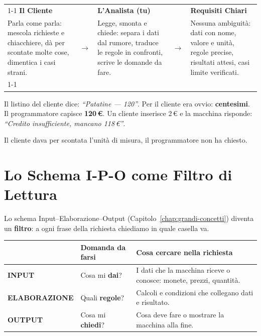\begin{center}
\renewcommand{\arraystretch}{1.5}
\begin{tabular}{|p{4cm}|c|p{4cm}|c|p{4cm}|}
\cline{1-1}\cline{3-3}\cline{5-5}
\cellcolor{PiazzaPrimary!10}\textbf{Il Cliente} & & \cellcolor{BoxBlue!10}\textbf{L'Analista (tu)} & & \cellcolor{BoxGreen!10}\textbf{Requisiti Chiari} \\
\small Parla come parla: mescola richieste e chiacchiere, dà per scontate molte cose, dimentica i casi strani.
 & \multicolumn{1}{c}{$\longrightarrow$} &
\small Legge, smonta e chiede: separa i dati dal rumore, traduce le regole in confronti, scrive le domande da fare.
 & \multicolumn{1}{c}{$\longrightarrow$} &
\small Nessuna ambiguità: dati con nome, valore e unità, regole precise, risultati attesi, casi limite verificati. \\
\cline{1-1}\cline{3-3}\cline{5-5}
\end{tabular}
\end{center}

\begin{attenzione}
Il listino del cliente dice: \emph{``Patatine --- 120''}. Per il cliente era ovvio: \textbf{centesimi}.\\
Il programmatore capisce \textbf{120\,\euro}. Un cliente inserisce 2\,\euro{} e la macchina risponde: \emph{``Credito insufficiente, mancano 118\,\euro''}.

\smallskip
Il cliente dava per scontata l'unità di misura, il programmatore non ha chiesto.
\end{attenzione}

\section{Lo Schema I-P-O come Filtro di Lettura}

Lo schema Input--Elaborazione--Output (Capitolo~\ref{chap:grandi-concetti}) diventa un \textbf{filtro}: a ogni frase della richiesta chiediamo in quale casella va.

\begin{center}
\renewcommand{\arraystretch}{1.45}
\begin{tabular}{|l|l|p{6.6cm}|}
\hline
\rowcolor{PiazzaPrimary!15}
 & \textbf{Domanda da farsi} & \textbf{Cosa cercare nella richiesta} \\
\hline
\textbf{\color{BoxBlue}INPUT} & Cosa mi \textbf{dai}? & I dati che la macchina riceve o conosce: monete, prezzi, quantità. \\
\hline
\textbf{\color{BoxAmber}ELABORAZIONE} & Quali \textbf{regole}? & Calcoli e condizioni che collegano dati e risultato. \\
\hline
\textbf{\color{PiazzaPrimary}OUTPUT} & Cosa mi \textbf{chiedi}? & Cosa deve fare o mostrare la macchina alla fine. \\
\hline
\end{tabular}
\end{center}

